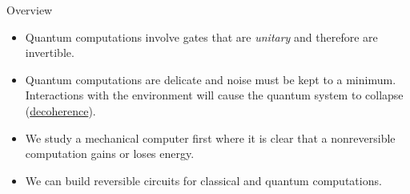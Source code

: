 
\begin{frame}{Overview}
\begin{itemize}
    \item Quantum computations involve gates that are \emph{unitary} and therefore are invertible.
    \item Quantum computations are delicate and noise must be kept to a minimum.  Interactions with the environment will cause the quantum system to collapse (\href{https://en.wikipedia.org/wiki/Quantum_decoherence}{decoherence}).
    \item We study a mechanical computer first where it is clear that a nonreversible computation gains or loses energy.
    \item We can build reversible circuits for classical and quantum computations.
    
\end{itemize}
\end{frame}

